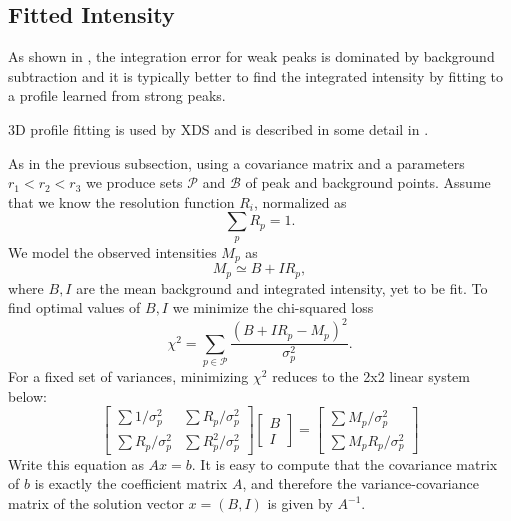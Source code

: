 \documentclass[11pt,a4paper]{article}
\def\calP{\mathcal{P}}
\def\calB{\mathcal{B}}
\begin{document}
\subsection{Fitted Intensity}

As shown in \cite{Dia69}, the integration error for weak peaks is dominated by background subtraction
and it is typically better to find the integrated intensity by fitting to a profile learned from strong peaks.

3D profile fitting is used by XDS \cite{Kab10a}
and is described in some detail in \cite{Kab88b,Kab10b}.

As in the previous subsection, using a covariance matrix and a parameters $r_1 < r_2 < r_3$ we produce sets $\calP$ and $\calB$ of peak and background points.
Assume that we know the resolution function $R_i$,
normalized as
\begin{equation}\label{Eresnor}
  \sum_p R_p = 1.
\end{equation}
We model the observed intensities $M_p$ as
\begin{equation} M_p \simeq B + I R_p, \end{equation}
where $B, I$ are the mean background and integrated intensity, yet to be fit. To find optimal values of $B,I$ we minimize the chi-squared loss
\begin{equation} \chi^2 = \sum_{p \in \calP} \frac{(B+IR_p - M_p)^2}{\sigma^2_p}. \end{equation}
For a fixed set of variances, minimizing $\chi^2$ reduces to the 2x2 linear system below:
\begin{equation}
  \begin{bmatrix}
    \sum 1/\sigma^2_p & \sum R_p / \sigma^2_p \\
    \sum R_p/\sigma_p^2 & \sum R_p^2 / \sigma^2_p
  \end{bmatrix}
  \begin{bmatrix}
    B \\
    I
  \end{bmatrix}
  =
  \begin{bmatrix}
    \sum M_p/\sigma^2_p \\
    \sum M_p R_p / \sigma^2_p
  \end{bmatrix}
\end{equation}
Write this equation as $Ax = b$. It is easy to compute that the covariance matrix of $b$ is exactly the coefficient matrix
 $A$, and therefore the variance-covariance matrix of the solution vector $x = (B, I)$ is given by $A^{-1}$.
\end{document}

